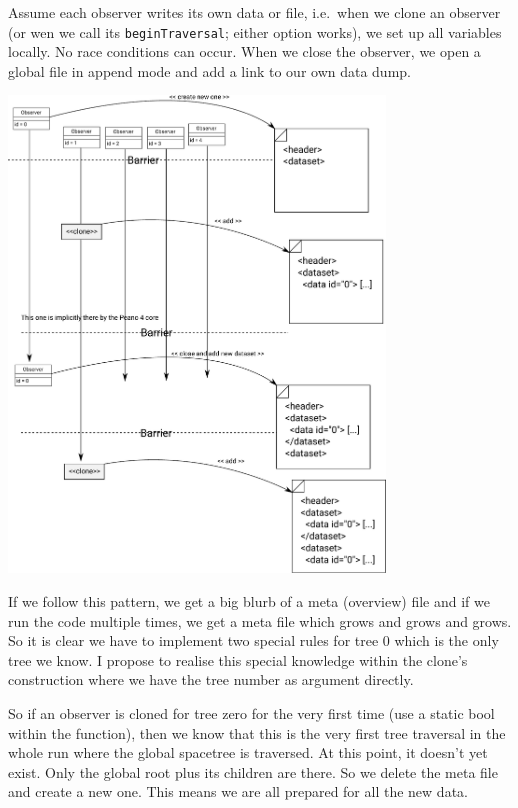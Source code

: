 Assume each observer writes its own data or file, i.e.~when we clone an observer
(or wen we call its \texttt{beginTraversal}; either option works), we set up all
variables locally.
No race conditions can occur.
When we close the observer, we open a global file in append mode and add a link
to our own data dump.


\begin{center}
 \includegraphics[width=0.75\textwidth]{37_synchronisation/synchronisation-02.pdf}
\end{center}



If we follow this pattern, we get a big blurb of a meta (overview) file and if
we run the code multiple times, we get a meta file which grows and grows and
grows.
So it is clear we have to implement two special rules for tree 0 which is the
only tree we know.
I propose to realise this special knowledge within the clone's construction
where we have the tree number as argument directly.


So if an observer is cloned for tree zero for the very first time (use a static
bool within the function), then we know that this is the very first tree
traversal in the whole run where the global spacetree is traversed.
At this point, it doesn't yet exist. Only the global root plus its children are
there.
So we delete the meta file and create a new one.
This means we are all prepared for all the new data.


